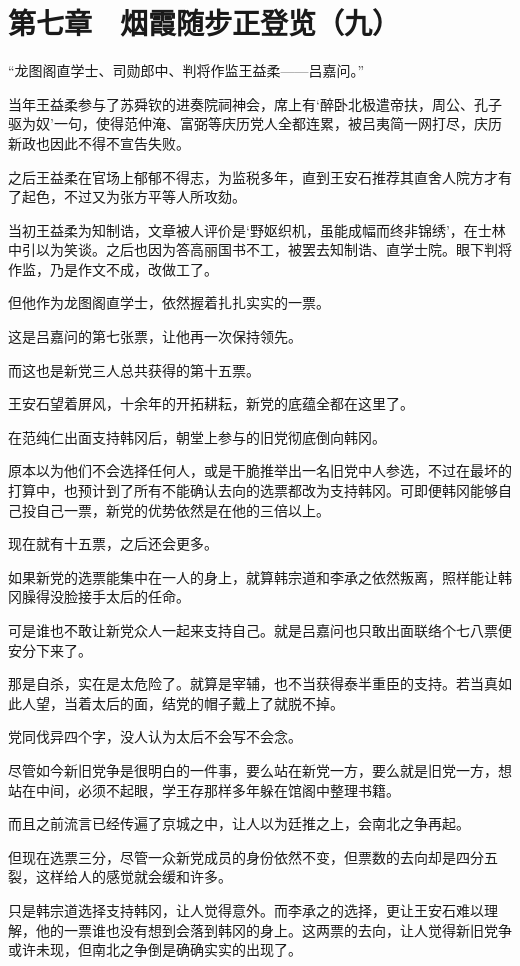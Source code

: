 \section{第七章　烟霞随步正登览（九）}

“龙图阁直学士、司勋郎中、判将作监王益柔——吕嘉问。”

当年王益柔参与了苏舜钦的进奏院祠神会，席上有‘醉卧北极遣帝扶，周公、孔子驱为奴’一句，使得范仲淹、富弼等庆历党人全都连累，被吕夷简一网打尽，庆历新政也因此不得不宣告失败。

之后王益柔在官场上郁郁不得志，为监税多年，直到王安石推荐其直舍人院方才有了起色，不过又为张方平等人所攻劾。

当初王益柔为知制诰，文章被人评价是‘野妪织机，虽能成幅而终非锦绣’，在士林中引以为笑谈。之后也因为答高丽国书不工，被罢去知制诰、直学士院。眼下判将作监，乃是作文不成，改做工了。

但他作为龙图阁直学士，依然握着扎扎实实的一票。

这是吕嘉问的第七张票，让他再一次保持领先。

而这也是新党三人总共获得的第十五票。

王安石望着屏风，十余年的开拓耕耘，新党的底蕴全都在这里了。

在范纯仁出面支持韩冈后，朝堂上参与的旧党彻底倒向韩冈。

原本以为他们不会选择任何人，或是干脆推举出一名旧党中人参选，不过在最坏的打算中，也预计到了所有不能确认去向的选票都改为支持韩冈。可即便韩冈能够自己投自己一票，新党的优势依然是在他的三倍以上。

现在就有十五票，之后还会更多。

如果新党的选票能集中在一人的身上，就算韩宗道和李承之依然叛离，照样能让韩冈臊得没脸接手太后的任命。

可是谁也不敢让新党众人一起来支持自己。就是吕嘉问也只敢出面联络个七八票便安分下来了。

那是自杀，实在是太危险了。就算是宰辅，也不当获得泰半重臣的支持。若当真如此人望，当着太后的面，结党的帽子戴上了就脱不掉。

党同伐异四个字，没人认为太后不会写不会念。

尽管如今新旧党争是很明白的一件事，要么站在新党一方，要么就是旧党一方，想站在中间，必须不起眼，学王存那样多年躲在馆阁中整理书籍。

而且之前流言已经传遍了京城之中，让人以为廷推之上，会南北之争再起。

但现在选票三分，尽管一众新党成员的身份依然不变，但票数的去向却是四分五裂，这样给人的感觉就会缓和许多。

只是韩宗道选择支持韩冈，让人觉得意外。而李承之的选择，更让王安石难以理解，他的一票谁也没有想到会落到韩冈的身上。这两票的去向，让人觉得新旧党争或许未现，但南北之争倒是确确实实的出现了。

